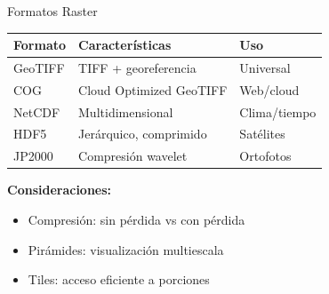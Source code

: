 \documentclass[10pt,aspectratio=169]{beamer}
\begin{document}
\begin{frame}{Formatos Raster}
    \begin{center}
    \begin{table}
        \footnotesize
        \begin{tabular}{lll}
        \toprule
        \textbf{Formato} & \textbf{Características} & \textbf{Uso} \\
        \midrule
        GeoTIFF & TIFF + georeferencia & Universal \\
        COG & Cloud Optimized GeoTIFF & Web/cloud \\
        NetCDF & Multidimensional & Clima/tiempo \\
        HDF5 & Jerárquico, comprimido & Satélites \\
        JP2000 & Compresión wavelet & Ortofotos \\
        \bottomrule
        \end{tabular}
    \end{table}
    \end{center}
    
    \vspace{0.3cm}
    
    \begin{tcolorbox}[colframe=usachblue,colback=blue!5]
        \footnotesize
        \textbf{Consideraciones:}
        \begin{itemize}
            \item Compresión: sin pérdida vs con pérdida
            \item Pirámides: visualización multiescala
            \item Tiles: acceso eficiente a porciones
        \end{itemize}
    \end{tcolorbox}
\end{frame}
\end{document}
